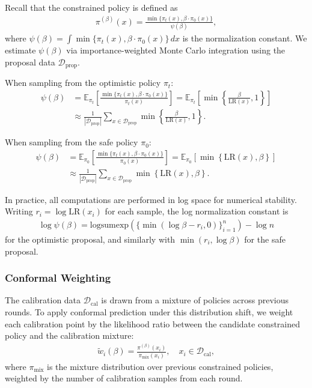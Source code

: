 Recall that the constrained policy is defined as
\begin{align}
    \pi^{(\beta)}(x) = \frac{\min\{\pi_t(x), \beta \cdot \pi_0(x)\}}{\psi(\beta)},
\end{align}
where $\psi(\beta) = \int \min\{\pi_t(x), \beta \cdot \pi_0(x)\} \, dx$ is the normalization constant. We estimate $\psi(\beta)$ via importance-weighted Monte Carlo integration using the proposal data $\mathcal{D}_{\mathrm{prop}}$.

When sampling from the optimistic policy $\pi_t$:
\begin{align}
    \psi(\beta)
    &= \mathbb{E}_{\pi_t}\left[\frac{\min\{\pi_t(x), \beta \cdot \pi_0(x)\}}{\pi_t(x)}\right]
    = \mathbb{E}_{\pi_t}\left[\min\left\{\frac{\beta}{\mathrm{LR}(x)}, 1\right\}\right] \\
    &\approx \frac{1}{|\mathcal{D}_{\mathrm{prop}}|} \sum_{x \in \mathcal{D}_{\mathrm{prop}}} \min\left\{\frac{\beta}{\mathrm{LR}(x)}, 1\right\}.
\end{align}

When sampling from the safe policy $\pi_0$:
\begin{align}
    \psi(\beta)
    &= \mathbb{E}_{\pi_0}\left[\frac{\min\{\pi_t(x), \beta \cdot \pi_0(x)\}}{\pi_0(x)}\right]
    = \mathbb{E}_{\pi_0}\left[\min\left\{\mathrm{LR}(x), \beta\right\}\right] \\
    &\approx \frac{1}{|\mathcal{D}_{\mathrm{prop}}|} \sum_{x \in \mathcal{D}_{\mathrm{prop}}} \min\left\{\mathrm{LR}(x), \beta\right\}.
\end{align}

In practice, all computations are performed in log space for numerical stability. Writing $r_i = \log \mathrm{LR}(x_i)$ for each sample, the log normalization constant is
\begin{align}
    \log \psi(\beta) = \mathrm{logsumexp}\left(\{\min(\log \beta - r_i, 0)\}_{i=1}^{n}\right) - \log n
\end{align}
for the optimistic proposal, and similarly with $\min(r_i, \log \beta)$ for the safe proposal.

\subsubsection{Conformal Weighting}
\label{app:conformal_weighting}

The calibration data $\mathcal{D}_{\mathrm{cal}}$ is drawn from a mixture of policies across previous rounds. To apply conformal prediction under this distribution shift, we weight each calibration point by the likelihood ratio between the candidate constrained policy and the calibration mixture:
\begin{align}
    \tilde{w}_i(\beta) = \frac{\pi^{(\beta)}(x_i)}{\pi_{\mathrm{mix}}(x_i)}, \quad x_i \in \mathcal{D}_{\mathrm{cal}},
\end{align}
where $\pi_{\mathrm{mix}}$ is the mixture distribution over previous constrained policies, weighted by the number of calibration samples from each round.

